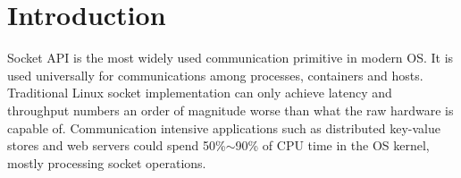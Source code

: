 \section{Introduction}
\label{sec:intro}


Socket API is the most widely used communication primitive in modern OS. It is used universally for communications among processes, containers and hosts.
Traditional Linux socket implementation can only achieve latency and throughput numbers an order of magnitude worse than what the raw hardware is capable of.
Communication intensive applications such as distributed key-value stores and web servers could spend 50\%$\sim$90\% of CPU time in the OS kernel, mostly processing socket operations.


